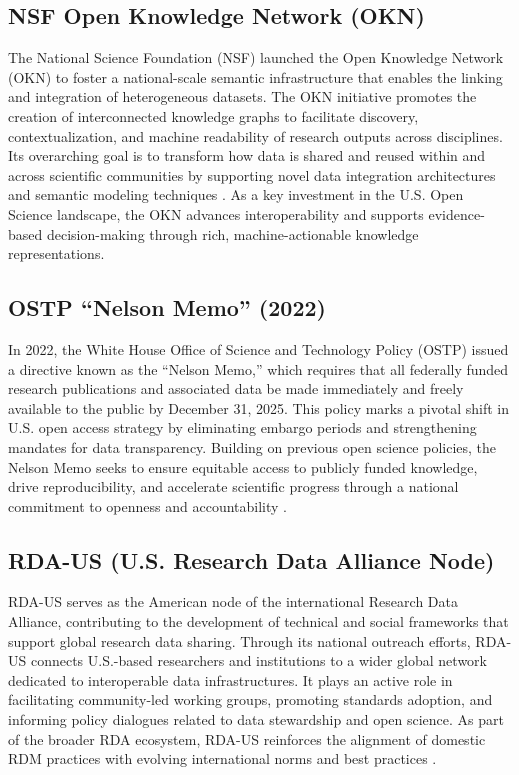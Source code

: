 \subsection{NSF Open Knowledge Network (OKN)}

The National Science Foundation (NSF) launched the Open Knowledge Network (OKN) to foster a national-scale semantic infrastructure that enables the linking and integration of heterogeneous datasets. The OKN initiative promotes the creation of interconnected knowledge graphs to facilitate discovery, contextualization, and machine readability of research outputs across disciplines. Its overarching goal is to transform how data is shared and reused within and across scientific communities by supporting novel data integration architectures and semantic modeling techniques \cite{nsf_okn}. As a key investment in the U.S. Open Science landscape, the OKN advances interoperability and supports evidence-based decision-making through rich, machine-actionable knowledge representations.

\subsection{OSTP “Nelson Memo” (2022)}

In 2022, the White House Office of Science and Technology Policy (OSTP) issued a directive known as the “Nelson Memo,” which requires that all federally funded research publications and associated data be made immediately and freely available to the public by December 31, 2025. This policy marks a pivotal shift in U.S. open access strategy by eliminating embargo periods and strengthening mandates for data transparency. Building on previous open science policies, the Nelson Memo seeks to ensure equitable access to publicly funded knowledge, drive reproducibility, and accelerate scientific progress through a national commitment to openness and accountability \cite{ostp_nelson}.

\subsection{RDA-US (U.S. Research Data Alliance Node)}

RDA-US serves as the American node of the international Research Data Alliance, contributing to the development of technical and social frameworks that support global research data sharing. Through its national outreach efforts, RDA-US connects U.S.-based researchers and institutions to a wider global network dedicated to interoperable data infrastructures. It plays an active role in facilitating community-led working groups, promoting standards adoption, and informing policy dialogues related to data stewardship and open science. As part of the broader RDA ecosystem, RDA-US reinforces the alignment of domestic RDM practices with evolving international norms and best practices \cite{rda_us}.


